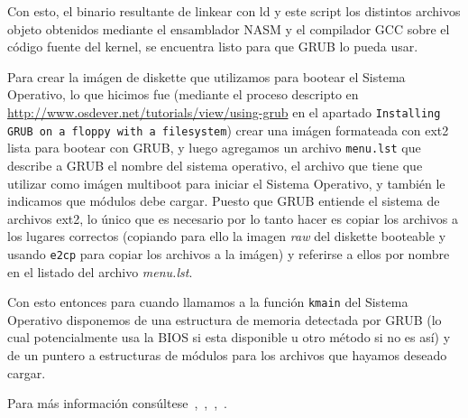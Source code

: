 Con esto, el binario resultante de linkear con ld y este script los distintos archivos objeto obtenidos mediante el ensamblador NASM
y el compilador GCC sobre el c\'odigo fuente del kernel, se encuentra listo para que GRUB lo pueda usar.

Para crear la im\'agen de diskette que utilizamos para bootear el Sistema Operativo, lo que hicimos fue (mediante el proceso descripto
en \url{http://www.osdever.net/tutorials/view/using-grub} en el apartado \texttt{Installing GRUB on a floppy with a filesystem}) crear
una im\'agen formateada con ext2 lista para bootear con GRUB, y luego agregamos un archivo \texttt{menu.lst} que describe a GRUB el
nombre del sistema operativo, el archivo que tiene que utilizar como im\'agen multiboot para iniciar el Sistema Operativo, y tambi\'en
le indicamos que m\'odulos debe cargar. Puesto que GRUB entiende el sistema de archivos ext2, lo \'unico que es necesario por lo tanto hacer
es copiar los archivos a los lugares correctos (copiando para ello la imagen \textit{raw} del diskette booteable y usando \texttt{e2cp} para
copiar los archivos a la im\'agen) y referirse a ellos por nombre en el listado del archivo \textit{menu.lst}.

Con esto entonces para cuando llamamos a la funci\'on \texttt{kmain} del Sistema Operativo disponemos de una estructura de memoria detectada
por GRUB (lo cual potencialmente usa la BIOS si esta disponible u otro m\'etodo si no es as\'i) y de un puntero a estructuras de m\'odulos
para los archivos que hayamos deseado cargar.

Para m\'as informaci\'on cons\'ultese~\cite{jamesmolloy},~\cite{osdev},~\cite{osdever},~\cite{gnugrub}.
